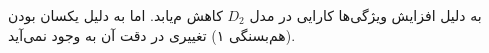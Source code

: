 
به دلیل افزایش ویژگی‌ها کارایی در مدل $D_2$  کاهش م‌یابد. اما به دلیل یکسان بودن (هم‌بسنگی ۱) تغییری در دقت آن به وجود نمی‌آید.
